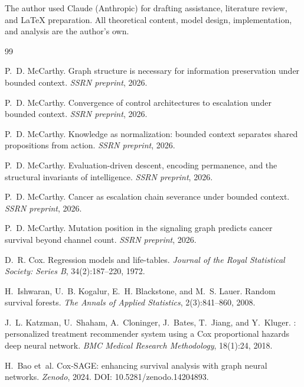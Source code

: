 \documentclass[11pt]{article}
\begin{document}
The author used Claude (Anthropic) for drafting assistance,
literature review, and \LaTeX{} preparation. All theoretical
content, model design, implementation, and analysis are the
author's own.


\begin{thebibliography}{99}

P.~D. McCarthy.
\newblock Graph structure is necessary for information preservation under
  bounded context.
\newblock \emph{SSRN preprint}, 2026.

P.~D. McCarthy.
\newblock Convergence of control architectures to escalation under bounded
  context.
\newblock \emph{SSRN preprint}, 2026.

P.~D. McCarthy.
\newblock Knowledge as normalization: bounded context separates shared
  propositions from action.
\newblock \emph{SSRN preprint}, 2026.

P.~D. McCarthy.
\newblock Evaluation-driven descent, encoding permanence, and the structural
  invariants of intelligence.
\newblock \emph{SSRN preprint}, 2026.

P.~D. McCarthy.
\newblock Cancer as escalation chain severance under bounded context.
\newblock \emph{SSRN preprint}, 2026.

P.~D. McCarthy.
\newblock Mutation position in the signaling graph predicts cancer survival
  beyond channel count.
\newblock \emph{SSRN preprint}, 2026.

D.~R. Cox.
\newblock Regression models and life-tables.
\newblock \emph{Journal of the Royal Statistical Society: Series B},
  34(2):187--220, 1972.

H.~Ishwaran, U.~B. Kogalur, E.~H. Blackstone, and M.~S. Lauer.
\newblock Random survival forests.
\newblock \emph{The Annals of Applied Statistics}, 2(3):841--860, 2008.

J.~L. Katzman, U.~Shaham, A.~Cloninger, J.~Bates, T.~Jiang, and Y.~Kluger.
: personalized treatment recommender system using a {Cox}
  proportional hazards deep neural network.
\newblock \emph{BMC Medical Research Methodology}, 18(1):24, 2018.

H.~Bao et~al.
\newblock Cox-{SAGE}: enhancing survival analysis with graph neural networks.
\newblock \emph{Zenodo}, 2024.
\newblock DOI: 10.5281/zenodo.14204893.


\end{thebibliography}
\end{document}
